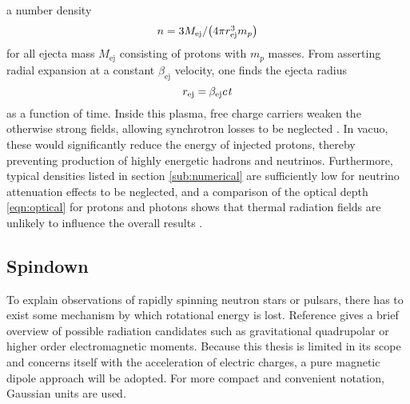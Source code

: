 a number density 
\begin{equation}
	\cramped{n = 3 M_\text{ej} / \bigl( 4\pi r_\text{ej}^3 m_p \bigr)} \kern+0.5pt
	\label{eqn:number-density}
\end{equation}
for all ejecta mass $M_\text{ej}$ consisting of protons with $m_p$ masses. From asserting radial expansion at a constant $\beta_\text{ej}$
velocity, one finds the ejecta radius
\begin{equation}
	r_\text{ej} = \kern-0.4pt \beta_\text{ej} \kern+0.1pt c \kern+1.0pt t
	\label{eqn:ejecta-radius}
\end{equation}
as a function of time. Inside this plasma, free charge carriers weaken the otherwise strong fields, allowing synchrotron losses to be
neglected \cite{Carpio_2020}. In vacuo, these would significantly reduce the energy of injected protons, thereby preventing production
of highly energetic hadrons and neutrinos. Furthermore, typical densities listed in section \ref{sub:numerical} are sufficiently low for
neutrino attenuation effects to be neglected, and a comparison of the optical depth \eqref{eqn:optical} for protons and photons shows that
thermal radiation fields are unlikely to influence the overall results \cite{Carpio_2020}.



\enlargethispage*{2\baselineskip}



\subsection{Spindown}
\label{sub:spindown}

To explain observations of rapidly spinning neutron stars or pulsars, there has to exist some mechanism by which rotational energy is
lost. Reference \cite{Alvarez_2004} gives a brief overview of possible radiation candidates such as gravitational quadrupolar or
higher order electromagnetic moments. Because this thesis is limited in its scope and concerns itself with the acceleration of
electric charges, a pure magnetic dipole approach will be adopted. For more compact and convenient notation, Gaussian units are used.

\newpage

